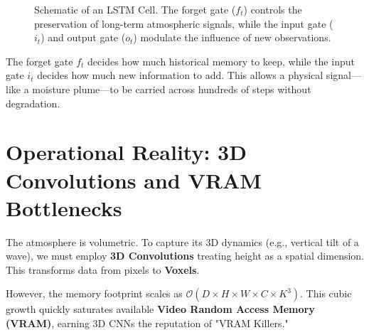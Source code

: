 \begin{figure}[H]
\centering
{}
\caption{Schematic of an LSTM Cell. The forget gate ($f_t$) controls the preservation of long-term atmospheric signals, while the input gate ($i_t$) and output gate ($o_t$) modulate the influence of new observations.}
\label{fig:lstm_tikz}
\end{figure}

The forget gate $f_t$ decides how much historical memory to keep, while the input gate $i_t$ decides how much new information to add. This allows a physical signal—like a moisture plume—to be carried across hundreds of steps without degradation.

\section{Operational Reality: 3D Convolutions and VRAM Bottlenecks}

The atmosphere is volumetric. To capture its 3D dynamics (e.g., vertical tilt of a wave), we must employ \textbf{3D Convolutions} treating height as a spatial dimension. This transforms data from pixels to \textbf{Voxels}. 

However, the memory footprint scales as $\mathcal{O}(D \times H \times W \times C \times K^3)$. This cubic growth quickly saturates available \textbf{Video Random Access Memory (VRAM)}, earning 3D CNNs the reputation of "VRAM Killers." 

